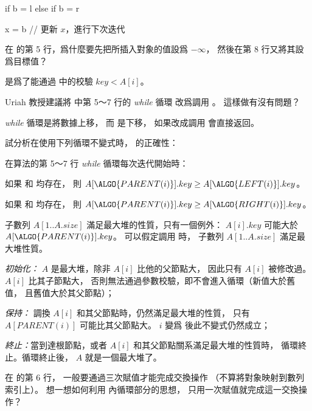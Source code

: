 	if b = l
	else if b = r

	x = b	// 更新 $x$，進行下次迭代
\stopCLRSCODE
\stopANSWER

\startEXERCISE
在  的第 5 行，爲什麼要先把所插入對象的值設爲 $-\infty$，
然後在第 8 行又將其設爲目標值？
\stopEXERCISE

\startANSWER
是爲了能通過  中的校驗 $key < A[i]$。
\stopANSWER

\startEXERCISE
Uriah 教授建議將  中第 5～7 行的 \emph{while} 循環
改爲調用 。
這樣做有沒有問題？
\stopEXERCISE

\startANSWER
\emph{while} 循環是將數據上移，
而  是下移，
如果改成調用  會直接返回。
\stopANSWER

\startEXERCISE
試分析在使用下列循環不變式時，  的正確性：

在算法的第 5～7 行 \emph{while} 循環每次迭代開始時：
\startigBase[a]
\item 如果  和  均存在，
則 $A[\ALGO{PARENT(i)}].key \ge A[\ALGO{LEFT(i)}].key$。

\item 如果  和  均存在，
則 $A[\ALGO{PARENT(i)}].key \ge A[\ALGO{RIGHT(i)}].key$。

\item 子數列 $A[1..A.size]$ 滿足最大堆的性質，只有一個例外：
$A[i].key$ 可能大於 $A[\ALGO{PARENT(i)}].key$。
\stopigBase
可以假定調用  時，
子數列 $A[1..A.size]$ 滿足最大堆性質。
\stopEXERCISE

\startANSWER
\emph{初始化：} $A$ 是最大堆，除非 $A[i]$ 比他的父節點大，
因此只有 $A[i]$ 被修改過。 $A[i]$ 比其子節點大，
否則無法通過參數校驗，即不會進入循環（新值大於舊值，
 且舊值大於其父節點）；

\emph{保持：} 調換 $A[i]$ 和其父節點時，仍然滿足最大堆的性質，
只有 $A[PARENT(i)]$ 可能比其父節點大。
 $i$ 變爲  後此不變式仍然成立；

\emph{終止：}當到達根節點，或者 $A[i]$ 和其父節點關系滿足最大堆的性質時，
循環終止。循環終止後， $A$ 就是一個最大堆了。
\stopANSWER

\startEXERCISE
在  的第 6 行，
一般要通過三次賦值才能完成交換操作
（不算將對象映射到數列索引上）。
想一想如何利用  內循環部分的思想，
只用一次賦值就完成這一交換操作？
\stopEXERCISE

